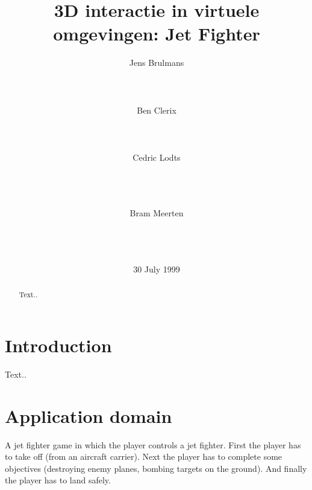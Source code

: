 \documentclass{acm_proc_article-sp}
\begin{document}
\title{3D interactie in virtuele omgevingen: Jet Fighter}

%
%
\author{
    \alignauthor Jens Brulmans\\
    \\
    \\
    \\
    \alignauthor Ben Clerix\\
    \\
    \\
    \\
    \alignauthor Cedric Lodts\\
    \\
    \\
    \\
    \and
    \alignauthor Bram Meerten\\
    \\
    \\
    \\
}

\date{30 July 1999}

\maketitle
\begin{abstract}
Text..
\end{abstract}


\section{Introduction}
Text..

\section {Application domain}
A jet fighter game in which the player controls a jet fighter. \newline
First the player has to take off (from an aircraft carrier). Next the player has to complete some objectives (destroying enemy planes, bombing targets on the ground). And finally the player has to land safely.
\end{document}
